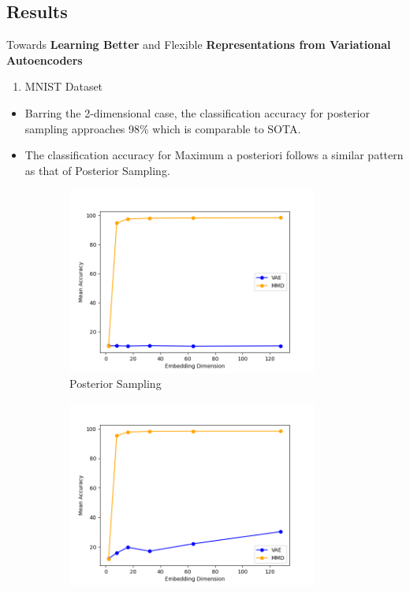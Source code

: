 \documentclass[hyperref={colorlinks,citecolor=blue,linkcolor=blue,urlcolor=blue}]{beamer}
\begin{document}
\subsection{Results}

\begin{frame}{ Towards \textbf{Learning Better} and Flexible \textbf{Representations from Variational Autoencoders} \vspace{0.3em}}
  \begin{enumerate}
    \item MNIST Dataset
  \end{enumerate}
  \begin{itemize}
    \item Barring the 2-dimensional case, the classification accuracy for posterior sampling approaches 98\% which is comparable to SOTA.
    \item The classification accuracy for Maximum a posteriori follows a similar pattern as that of Posterior Sampling.
  \end{itemize}
  \begin{figure}
    \begin{subfigure}[b]{0.4\textwidth}
        \centering
        \includegraphics[width=0.9\textwidth,]{./Images/MNIST_MMD_Sampling.png}
        \caption{Posterior Sampling}
    \end{subfigure}
    \begin{subfigure}[b]{0.4\textwidth}
        \centering
        \includegraphics[width=0.9\textwidth]{./Images/MNIST_MMD_MAP.png}

\end{subfigure}
\end{figure}
\end{frame}
\end{document}
